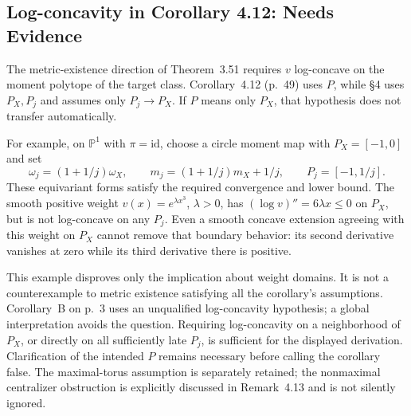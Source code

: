 \documentclass[10pt]{article}
\begin{document}
\subsection*{Log-concavity in Corollary 4.12: Needs Evidence}
The metric-existence direction of Theorem 3.51 requires \(v\) log-concave on the moment polytope of the target class. Corollary 4.12 (p. 49) uses \(P\), while §4 uses \(P_X,P_j\) and assumes only \(P_j\to P_X\). If \(P\) means only \(P_X\), that hypothesis does not transfer automatically.\par
For example, on \(\mathbb P^1\) with \(\pi=\mathrm{id}\), choose a circle moment map with \(P_X=[-1,0]\) and set \[\omega_j=(1+1/j)\omega_X,\qquad
 m_j=(1+1/j)m_X+1/j,\qquad P_j=[-1,1/j].\] These equivariant forms satisfy the required convergence and lower bound. The smooth positive weight \(v(x)=e^{\lambda x^3}\), \(\lambda>0\), has \((\log v)''=6\lambda x\le0\) on \(P_X\), but is not log-concave on any \(P_j\). Even a smooth concave extension agreeing with this weight on \(P_X\) cannot remove that boundary behavior: its second derivative vanishes at zero while its third derivative there is positive.\par
This example disproves only the implication about weight domains. It is not a counterexample to metric existence satisfying all the corollary’s assumptions. Corollary B on p. 3 uses an unqualified log-concavity hypothesis; a global interpretation avoids the question. Requiring log-concavity on a neighborhood of \(P_X\), or directly on all sufficiently late \(P_j\), is sufficient for the displayed derivation. Clarification of the intended \(P\) remains necessary before calling the corollary false. The maximal-torus assumption is separately retained; the nonmaximal centralizer obstruction is explicitly discussed in Remark 4.13 and is not silently ignored.\par
\end{document}
